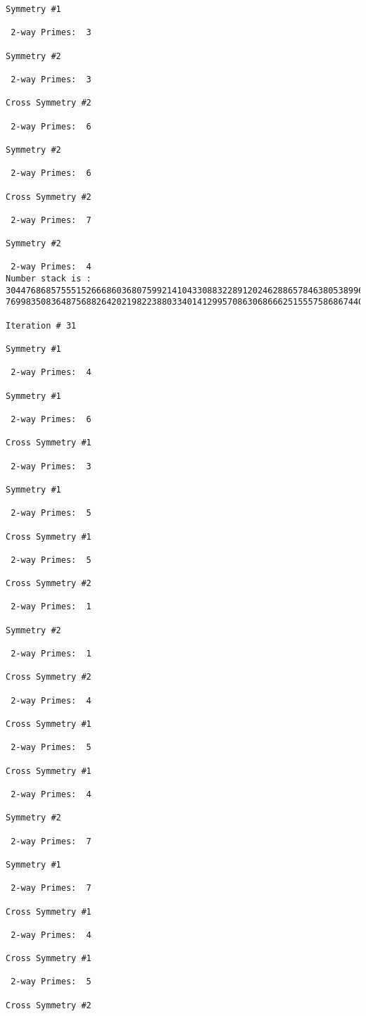 \begin{verbatim}
Symmetry #1

 2-way Primes: 	3

Symmetry #2

 2-way Primes: 	3

Cross Symmetry #2

 2-way Primes: 	6

Symmetry #2

 2-way Primes: 	6

Cross Symmetry #2

 2-way Primes: 	7

Symmetry #2

 2-way Primes: 	4
Number stack is :
30447686857555152666860368075992141043308832289120246288657846380538996794608835958544046240163340857
76998350836487568826420219822388033401412995708630686662515557586867440375804336104264044585953880649

Iteration #	31

Symmetry #1

 2-way Primes: 	4

Symmetry #1

 2-way Primes: 	6

Cross Symmetry #1

 2-way Primes: 	3

Symmetry #1

 2-way Primes: 	5

Cross Symmetry #1

 2-way Primes: 	5

Cross Symmetry #2

 2-way Primes: 	1

Symmetry #2

 2-way Primes: 	1

Cross Symmetry #2

 2-way Primes: 	4

Cross Symmetry #1

 2-way Primes: 	5

Cross Symmetry #1

 2-way Primes: 	4

Symmetry #2

 2-way Primes: 	7

Symmetry #1

 2-way Primes: 	7

Cross Symmetry #1

 2-way Primes: 	4

Cross Symmetry #1

 2-way Primes: 	5

Cross Symmetry #2


\end{verbatim}

